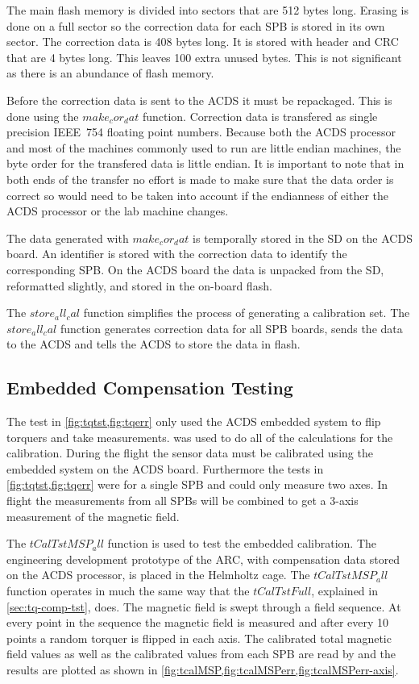The main flash memory is divided into sectors that are 512 bytes long. Erasing is done on a full sector so the correction data for each \ac{SPB} is stored in its own sector. The correction data is 408 bytes long. It is stored with header and \ac{CRC} that are 4 bytes long. This leaves 100 extra unused bytes. This is not significant as there is an abundance of flash memory.

Before the correction data is sent to the \ac{ACDS} it must be repackaged. This is done using the \lstMat$make_cor_dat$ function. Correction data is transfered as single precision IEEE~754 floating point numbers. Because both the \ac{ACDS} processor and most of the machines commonly used to run \matlab are little endian machines, the byte order for the transfered data is little endian. It is important to note that in both ends of the transfer no effort is made to make sure that the data order is correct so would need to be taken into account if the endianness of either the \ac{ACDS} processor or the lab machine changes.

The data generated with \lstMat$make_cor_dat$ is temporally stored in the \ac{SD} on the \ac{ACDS} board. An identifier is stored with the correction data to identify the corresponding \ac{SPB}. On the \ac{ACDS} board the data is unpacked from the \ac{SD}, reformatted slightly, and stored in the on-board flash. 

The \lstMat$store_all_cal$ function simplifies the process of generating a calibration set. The \lstMat$store_all_cal$ function generates correction data for all \ac{SPB} boards, sends the data to the \ac{ACDS} and tells the \ac{ACDS} to store the data in flash. 

\subsection{Embedded Compensation Testing}

The test in \cref{fig:tqtst,fig:tqerr} only used the \ac{ACDS} embedded system to flip torquers and take measurements. \matlab was used to do all of the calculations for the calibration. During the flight the sensor data must be calibrated using the embedded system on the \ac{ACDS} board. Furthermore the tests in \cref{fig:tqtst,fig:tqerr} were for a single \ac{SPB} and could only measure two axes. In flight the measurements from all \acp{SPB} will be combined to get a 3-axis measurement of the magnetic field.

The \lstMat$tCalTstMSP_all$ function is used to test the embedded calibration. The engineering development prototype of the \ac{ARC}, with compensation data stored on the \ac{ACDS} processor, is placed in the Helmholtz cage. The \lstMat$tCalTstMSP_all$ function operates in much the same way that the \lstMat$tCalTstFull$, explained in \cref{sec:tq-comp-tst}, does. The magnetic field is swept through a field sequence. At every point in the sequence the magnetic field is measured and after every 10 points a random torquer is flipped in each axis. The calibrated total magnetic field values as well as the calibrated values from each \ac{SPB} are read by \matlab and the results are plotted as shown in \cref{fig:tcalMSP,fig:tcalMSPerr,fig:tcalMSPerr-axis}.

